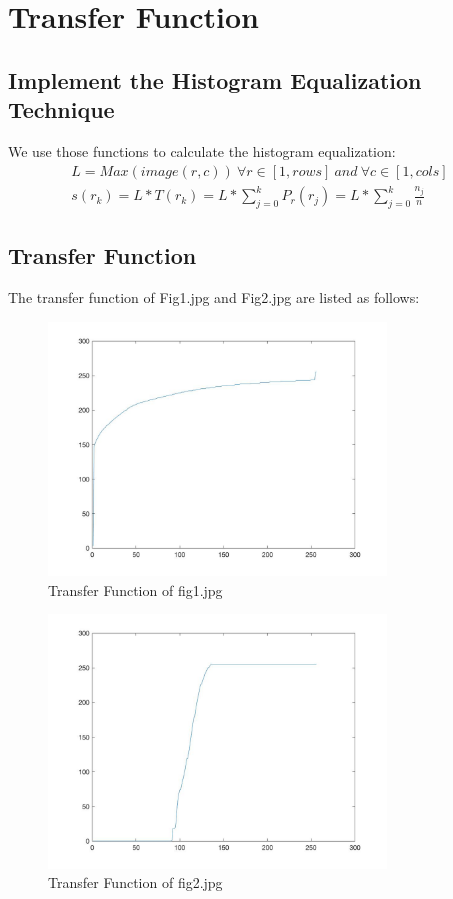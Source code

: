 \documentclass[11pt,oneside]{book}
\begin{document}
\section{Transfer Function}
\subsection{Implement the Histogram Equalization Technique}
We use those functions to calculate the histogram equalization:\\
\begin{align}
L=Max(image(r,c))\ \forall r \in [1,rows]\ and\ \forall c \in [1,cols]\\
s(r_k) = L*T(r_k) = L*\sum_{j=0}^kP_r(r_j)=L*\sum_{j=0}^k\frac{n_j}{n}
\end{align}
\newpage
\subsection{Transfer Function}
The transfer function of Fig1.jpg and Fig2.jpg are listed as follows:
\begin{figure}[!htb]
   \centering  
   \includegraphics[width=0.8\textwidth]{images/1/transfer_f1.jpg}
   \caption{Transfer Function of fig1.jpg}  
\end{figure}
\begin{figure}[!htb]
   \centering  
   \includegraphics[width=0.8\textwidth]{images/1/transfer_f2.jpg}
   \caption{Transfer Function of fig2.jpg}  
\end{figure}
\end{document}
